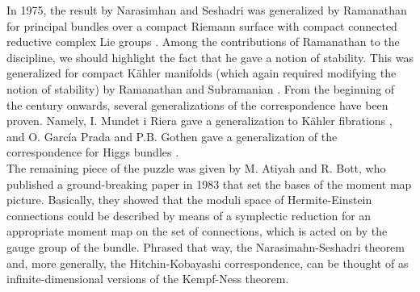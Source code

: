 In 1975, the result by Narasimhan and Seshadri was generalized by Ramanathan for principal bundles over a compact Riemann surface with compact connected reductive complex Lie groups \parencite{ramanathan1975stable}. Among the contributions of Ramanathan to the discipline, we should highlight the fact that he gave a notion of stability. This was generalized for compact Kähler manifolds (which again required modifying the notion of stability) by Ramanathan and Subramanian \parencite{SubramanianRamanathan}. From the beginning of the century onwards, several generalizations of the correspondence have been proven. Namely, I. Mundet i Riera gave a generalization to Kähler fibrations \parencite{i1999hitchin}, and O. García Prada and P.B. Gothen gave a generalization of the correspondence for Higgs bundles \parencite{garcia2009hitchin}. \\

The remaining piece of the puzzle was given by M. Atiyah and R. Bott, who published a ground-breaking paper \parencite{atiyah1983yang} in 1983 that set the bases of the moment map picture. Basically, they showed that the moduli space of Hermite-Einstein connections could be described by means of a symplectic reduction for an appropriate moment map on the set of connections, which is acted on by the gauge group of the bundle. Phrased that way, the Narasimahn-Seshadri theorem and, more generally, the Hitchin-Kobayashi correspondence, can be thought of as infinite-dimensional versions of the Kempf-Ness theorem. %

